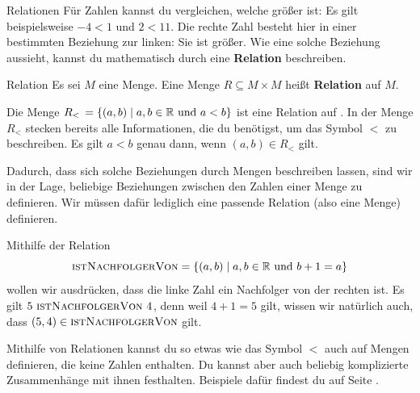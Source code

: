 \documentclass[../../main.tex]{subfiles}
\begin{document}
\begin{advanced}{Relationen}
    Für Zahlen kannst du vergleichen, welche größer ist: Es gilt beispielsweise $-4<1$ und $2<11$. Die rechte Zahl besteht hier in einer bestimmten Beziehung zur linken: Sie ist größer. Wie eine solche Beziehung aussieht, kannst du mathematisch durch eine \textbf{Relation} beschreiben.

    \begin{definition}{Relation}
        Es sei $M$ eine Menge. Eine Menge $R\subseteq M \times M$ heißt \textbf{Relation} auf $M$.
    \end{definition}

    Die Menge $R_<\,=\{(a,b)\mid a,b\in\mathbb{R}~\text{und}~a<b\}$ ist eine Relation auf \Real. In der Menge $R_<$ stecken bereits alle Informationen, die du benötigst, um das Symbol $<$ zu beschreiben. Es gilt $a<b$ genau dann, wenn $(a,b)\in R_<$ gilt.

    Dadurch, dass sich solche Beziehungen durch Mengen beschreiben lassen, sind wir in der Lage, beliebige Beziehungen zwischen den Zahlen einer Menge zu definieren. Wir müssen dafür lediglich eine passende Relation (also eine Menge) definieren.

    \begin{example}{}
        Mithilfe der Relation \[\textsc{istNachfolgerVon}=\{(a,b)\mid a,b\in\mathbb{R}\text{~und~}b+1=a\}\]
        wollen wir ausdrücken, dass die linke Zahl ein Nachfolger von der rechten ist. Es gilt $5~\textsc{istNachfolgerVon}~4$, denn weil $4+1=5$ gilt, wissen wir natürlich auch, dass $(5,4)\in\textsc{istNachfolgerVon}$ gilt.
    \end{example}
    Mithilfe von Relationen kannst du so etwas wie das Symbol $<$ auch auf Mengen definieren, die keine Zahlen enthalten. Du kannst aber auch beliebig komplizierte Zusammenhänge mit ihnen festhalten. Beispiele dafür findest du auf Seite \pageref{relationen}.
\end{advanced}
\end{document}

